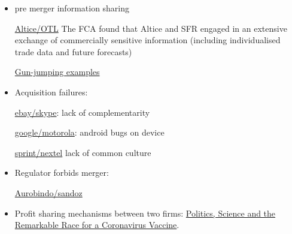 \documentclass[a4paper,leqno]{article}%
\begin{document}
\begin{itemize}
    \item pre merger information sharing
    
    \href{https://sites-herbertsmithfreehills.vuturevx.com/46/12874/compose-email/the-altice-case--a-costly-warning-not-to-engage-in-gun-jumping-before-receiving-merger-control-clearance.asp}{Altice/OTL} The FCA found that Altice and SFR engaged in an extensive exchange of commercially sensitive information (including individualised trade data and future forecasts)
    
    \href{https://www.twobirds.com/en/news/articles/2020/global/double-caution-gun-jumping-risks-in-m-and-a-transactions}{Gun-jumping examples}
    \item Acquisition failures:
    
    \href{https://www.investopedia.com/articles/insights/061816/4-cases-when-ma-strategy-failed-acquirer-ebay-bac.asp}{ebay/skype}: lack of complementarity
    
    \href{https://salessynergy.net/the-biggest-acquisition-disasters-that-put-companies-into-quite-a-bit-of-trouble/}{google/motorola}: android bugs on device
    
    \href{https://www.investopedia.com/articles/financial-theory/08/merger-acquisition-disasters.asp#:~:text=The\%20consolidation\%20of\%20AOL\%20Time,combination\%20up\%20until\%20that\%20time}{sprint/nextel} lack of common culture
    
    \item Regulator forbids merger:
    
    \href{https://www.livemint.com/companies/news/aurobindo-pharma-calls-off-1-billion-deal-with-sandoz-after-failing-to-get-ftc-nod-11585801128011.html}{Aurobindo/sandoz}
    
    \item Profit sharing mechanisms between two firms: \href{https://www.nytimes.com/2020/11/21/us/politics/coronavirus-vaccine.html?referringSource=articleShare}{Politics, Science and the Remarkable Race for a Coronavirus Vaccine}.
\end{itemize}
\end{document}
